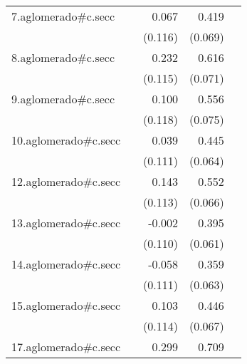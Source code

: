 {\begin{longtable}{l*{4}{D{.}{.}{-1}}}
\addlinespace
7.aglomerado#c.secc&                     &       0.067         &       0.419\sym{***}&                     \\
            &                     &     (0.116)         &     (0.069)         &                     \\
\addlinespace
8.aglomerado#c.secc&                     &       0.232\sym{*}  &       0.616\sym{***}&                     \\
            &                     &     (0.115)         &     (0.071)         &                     \\
\addlinespace
9.aglomerado#c.secc&                     &       0.100         &       0.556\sym{***}&                     \\
            &                     &     (0.118)         &     (0.075)         &                     \\
\addlinespace
10.aglomerado#c.secc&                     &       0.039         &       0.445\sym{***}&                     \\
            &                     &     (0.111)         &     (0.064)         &                     \\
\addlinespace
12.aglomerado#c.secc&                     &       0.143         &       0.552\sym{***}&                     \\
            &                     &     (0.113)         &     (0.066)         &                     \\
\addlinespace
13.aglomerado#c.secc&                     &      -0.002         &       0.395\sym{***}&                     \\
            &                     &     (0.110)         &     (0.061)         &                     \\
\addlinespace
14.aglomerado#c.secc&                     &      -0.058         &       0.359\sym{***}&                     \\
            &                     &     (0.111)         &     (0.063)         &                     \\
\addlinespace
15.aglomerado#c.secc&                     &       0.103         &       0.446\sym{***}&                     \\
            &                     &     (0.114)         &     (0.067)         &                     \\
\addlinespace
17.aglomerado#c.secc&                     &       0.299\sym{*}  &       0.709\sym{***}&                     \\

\end{longtable}}
